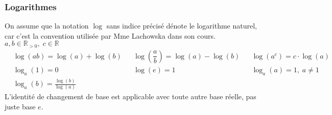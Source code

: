 \documentclass{article}
\begin{document}
\subsubsection{Logarithmes}
On assume que la notation \(\log\) sans indice précisé dénote le logarithme naturel, car c'est la convention utilisée par Mme Lachowska dans son cours. \\
\(a, b \in \mathbb{R}_{>0}, \; c \in \mathbb{R}\)
\begin{align*}
	&\log(ab) = \log(a) + \log(b) 
		& &\log{\left (\dfrac{a}{b}\right )} = \log (a) - \log (b) 
			& &\log(a^c) = c \cdot \log(a) \\
	&\log_a(1) = 0 
		& &\log(e) = 1 
			& &\log_a(a)	= 1, \; a \neq 1 \\
	&\log_a(b) = \frac{\log(b)}{\log(a)}
\end{align*}
L'identité de changement de base est applicable avec toute autre base réelle, pas juste base \(e\).
\end{document}

